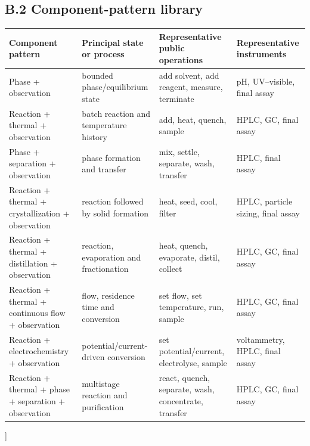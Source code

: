 \documentclass[10pt,twocolumn]{article}
\begin{document}
\begin{@twocolumnfalse}
\subsection{B.2 Component-pattern library}\label{appendix-b.2-component-pattern-library}
\centering
\small
{}
\label{tab:component-pattern-library}
\begin{tabularx}{\textwidth}{@{}L{0.19\textwidth}L{0.20\textwidth}YL{0.19\textwidth}@{}}
\toprule
Component pattern & Principal state or process & Representative public operations & Representative instruments \\
\midrule
Phase + observation & bounded phase/equilibrium state & add solvent, add reagent, measure, terminate & pH, UV--visible, final assay \\
Reaction + thermal + observation & batch reaction and temperature history & add, heat, quench, sample & HPLC, GC, final assay \\
Phase + separation + observation & phase formation and transfer & mix, settle, separate, wash, transfer & HPLC, final assay \\
Reaction + thermal + crystallization + observation & reaction followed by solid formation & heat, seed, cool, filter & HPLC, particle sizing, final assay \\
Reaction + thermal + distillation + observation & reaction, evaporation and fractionation & heat, quench, evaporate, distil, collect & HPLC, GC, final assay \\
Reaction + thermal + continuous flow + observation & flow, residence time and conversion & set flow, set temperature, run, sample & HPLC, GC, final assay \\
Reaction + electrochemistry + observation & potential/current-driven conversion & set potential/current, electrolyse, sample & voltammetry, HPLC, final assay \\
Reaction + thermal + phase + separation + observation & multistage reaction and purification & react, quench, separate, wash, concentrate, transfer & HPLC, GC, final assay \\
\bottomrule
\end{tabularx}
\end{@twocolumnfalse}
]
\end{document}
